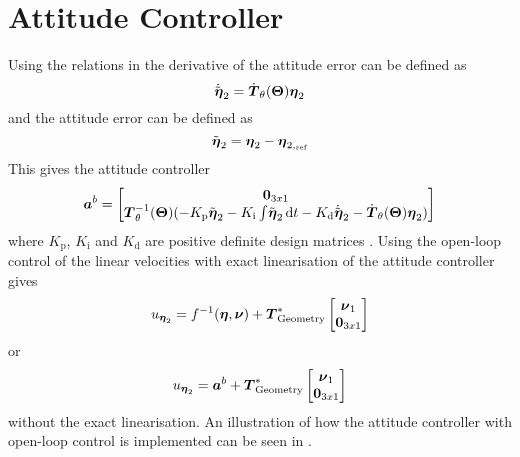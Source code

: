 \section{Attitude Controller}  
Using the relations in  the derivative of the attitude error can be defined as 
\begin{equation}
\etaTildeAngdot = \dot{\boldsymbol{T}}_\theta(\eulerAngles)\etaVectorAng
\end{equation}
and the attitude error can be defined as 
\begin{equation}
\etaTildeAng = \etaVectorAng - \etaVectorAng[,_{\text{ref}}] 
\end{equation}
This gives the \abbrPID attitude controller
\begin{equation}
	\accVector^b = \begin{bmatrix} 
	\zeroCol{3} \\
	\boldsymbol{T}^{-1}_\theta(\eulerAngles)(-K_{\text{p}} \etaTildeAng - K_{\text{i}}\int \! \etaTildeAng \, \mathrm{d}t - K_{\text{d}} \etaTildeAngdot - \dot{\boldsymbol{T}}_\theta(\eulerAngles) \etaVectorAng)
	\end{bmatrix}
\end{equation}
where $K_{\text{p}}$, $K_{\text{i}}$ and $K_{\text{d}}$ are positive definite design matrices \citep[p. 453]{fossen2011}. 
Using the open-loop control of the linear velocities with exact linearisation of the attitude controller gives
\begin{equation}
	u_{\etaVectorAng} = f^{-1}(\etaVector,\nuVector) + \thrusterGeometryOnes[*] \begin{bmatrix} \nuVectorLin \\ \zeroCol{3} \end{bmatrix}
\end{equation}
or
\begin{equation}
	u_{\etaVectorAng} = \accVector^b + \thrusterGeometryOnes[*] \begin{bmatrix} \nuVectorLin \\ \zeroCol{3} \end{bmatrix}
\end{equation}
without the exact linearisation. An illustration of how the attitude controller with open-loop control is implemented can be seen in .

